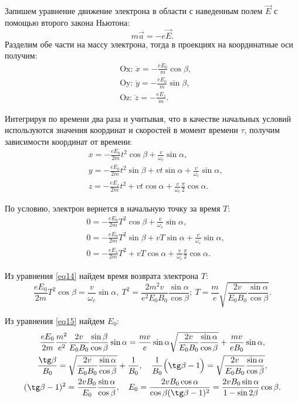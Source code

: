     Запишем уравнение движение электрона в области с наведенным полем
    \( \vec{E} \) с помощью второго закона Ньютона:
    \[
        m\vec{a} = -e\vec{E}.
    \]
    Разделим обе части на массу электрона, тогда в проекциях на координатные
    оси получим:
    \begin{align*}
        & \text{Ox: } \ddot{x} = -\frac{eE_0}{m}\cos\beta, \\
        & \text{Oy: } \ddot{y} = -\frac{eE_0}{m}\sin\beta, \\
        & \text{Oz: } \ddot{z} = -\frac{eE_z}{m}.
    \end{align*}
    
    Интегрируя по времени два раза и учитывая, что в качестве начальных условий
    используются значения координат и скоростей в момент времени \( \tau \),
    получим зависимости координат от времени:
    \begin{align*}
        & x = -\frac{eE_0}{2m}t^2\cos\beta + \frac{v}{\omega_c}\sin\alpha, \\
        & y = -\frac{eE_0}{2m}t^2\sin\beta + vt\sin\alpha + \frac{v}{\omega_c}
        \sin\alpha, \\
        & z = -\frac{eE_z}{2m}t^2 + vt\cos\alpha + \frac{v}{\omega_c}
        \frac{\pi}{2}\cos\alpha.
    \end{align*}
    
    По условию, электрон вернется в начальную точку за время \( T \):
    \begin{align}
        & 0 = -\frac{eE_0}{2m}T^2\cos\beta + \frac{v}{\omega_c}\sin\alpha,
        \label{eq14} \\
        & 0 = -\frac{eE_0}{2m}T^2\sin\beta + vT\sin\alpha + \frac{v}{\omega_c}
        \sin\alpha, \label{eq15} \\
        & 0 = -\frac{eE_z}{2m}T^2 + vT\cos\alpha + \frac{v}{\omega_c}
        \frac{\pi}{2}\cos\alpha. \label{eq16}
    \end{align}
    
    Из уравнения \eqref{eq14} найдем время возврата электрона \( T \):
    \[
        \frac{eE_0}{2m}T^2\cos\beta = \frac{v}{\omega_c}\sin\alpha,\ 
        T^2 = \frac{2m^2v}{e^2E_0B_0}\frac{\sin\alpha}{\cos\beta};\ 
        T = \frac{m}{e}\sqrt{\frac{2v}{E_0B_0}\frac{\sin\alpha}{\cos\beta}}.
    \]
    
    Из уравнения \eqref{eq15} найдем \( E_0 \):
    \begin{gather*}
        \frac{eE_0}{2m}\frac{m^2}{e^2}\frac{2v}{E_0B_0}\frac{\sin\beta}
        {\cos\beta}\sin\alpha = \frac{mv}{e}\sin\alpha\sqrt{\frac{2v}{E_0B_0}
        \frac{\sin\alpha}{\cos\beta}} + \frac{mv}{eB_0}\sin\alpha, \\
        \frac{\tg\beta}{B_0} = \sqrt{\frac{2v}{E_0B_0}\frac{\sin\alpha}
        {\cos\beta}} + \frac{1}{B_0}, \quad \frac{1}{B_0}\Big(\tg\beta - 1\Big)
        = \sqrt{\frac{2v}{E_0B_0}\frac{\sin\alpha}{\cos\beta}}, \\
        (\tg\beta - 1)^2 = \frac{2vB_0}{E_0}\frac{\sin\alpha}{\cos\beta}, \quad
        E_0 = \frac{2vB_0\cos\alpha}{\cos\beta(\tg\beta - 1)^2} =
        \frac{2vB_0\sin\alpha}{1 - \sin2\beta}\cos\beta.
    \end{gather*}
    
